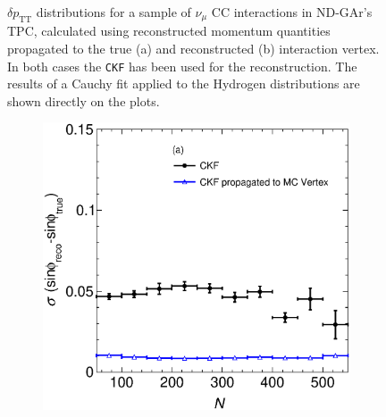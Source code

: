 \begin{figure}[t]
\begin{subfigure}[b]{0.48\textwidth}
         \caption{}  \label{fig:dpTT_ALICEStRecoGArReco}
     \end{subfigure}
        \caption{$\delta p_\text{TT}$ distributions for a sample of $\nu_\mu$ CC interactions in ND-GAr's TPC, calculated using reconstructed momentum quantities propagated to the true (a) and reconstructed (b) interaction vertex. In both cases the \texttt{CKF} has been used for the reconstruction. The results of a Cauchy fit applied to the Hydrogen distributions are shown directly on the plots. } \label{fig:dpTTVertex}
\end{figure}

\begin{figure}[t]
     \centering
     \begin{subfigure}{0.32\textwidth}
         \centering
         \includegraphics[width=\textwidth]{figures/ch6-TKI/sinphiRes/RessinphiVSNPoints_VertexComparison_13.eps}
         \caption{} \label{fig:RessinphiVSNPoints_VertexComparison_13}
     \end{subfigure}
     \begin{subfigure}{0.32\textwidth}
         \centering

\end{subfigure}
\end{figure}
